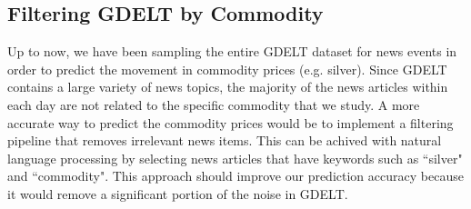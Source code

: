 \subsection{Filtering GDELT by Commodity}
Up to now, we have been sampling the entire GDELT dataset for news events in order to predict the movement in commodity prices (e.g. silver). Since GDELT contains a large variety of news topics, the majority of the news articles within each day are not related to the specific commodity that we study. A more accurate way to predict the commodity prices would be to implement a filtering pipeline that removes irrelevant news items. This can be achived with natural language processing by selecting news articles that have keywords such as ``silver" and ``commodity". This approach should improve our prediction accuracy because it would remove a significant portion of the noise in GDELT.


